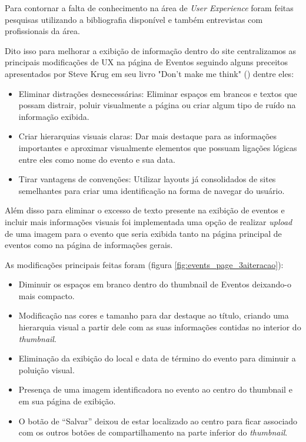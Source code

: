 \par Para contornar a falta de conhecimento na área de \emph{User Experience} foram feitas pesquisas utilizando a bibliografia disponível e também entrevistas com profissionais da área.
	\par Dito isso para melhorar a exibição de informação dentro do site centralizamos as principais modificações de UX na página de Eventos seguindo alguns preceitos apresentados por Steve Krug em seu livro "Don't make me think" (\cite{krug:00}) dentre eles:
	\begin{itemize}
	\item Eliminar distrações desnecessárias: Eliminar espaços em brancos e textos que possam distrair, poluir visualmente a página ou criar algum tipo de ruído na informação exibida.
	\item Criar hierarquias visuais claras: Dar mais destaque para as informações importantes e aproximar visualmente elementos que possuam ligações lógicas entre eles como nome do evento e sua data.
	\item Tirar vantagens de convenções: Utilizar layouts já consolidados de sites semelhantes para criar uma identificação na forma de navegar do usuário.
\end{itemize}
	\par Além disso para eliminar o excesso de texto presente na exibição de eventos e incluir mais informações visuais foi implementada uma opção de realizar \emph{upload} de uma imagem para o evento que seria exibida tanto na página principal de eventos como na página de informações gerais.
\par As modificações principais feitas foram (figura \ref{fig:events_page_3aiteracao}):
\begin{itemize}
\item Diminuir os espaços em branco dentro do thumbnail de Eventos deixando-o mais compacto.
\item Modificação nas cores e tamanho para dar destaque ao título, criando uma hierarquia visual a partir dele com as suas informações contidas no interior do \emph{thumbnail}.
\item Eliminação da exibição do local e data de término do evento para diminuir a poluição visual.
\item Presença de uma imagem identificadora no evento ao centro do thumbnail e em sua página de exibição.
\item O botão de “Salvar” deixou de estar localizado ao centro para ficar associado com os outros botões de compartilhamento na parte inferior do \emph{thumbnail}.
\end{itemize}

